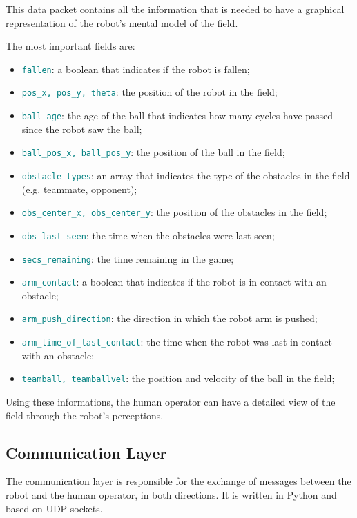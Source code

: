 \documentclass[a4paper, onecolumn, 12pt]{article}
\newcommand\code[1]{\textcolor{teal}{\texttt{#1}}}
\begin{document}
This data packet contains all the information that is needed to have a graphical
representation of the robot's mental model of the field.

The most important fields are:
\begin{itemize}
    \item \code{fallen}: a boolean that indicates if the robot is fallen;
    \item \code{pos\_x, pos\_y, theta}: the position of the robot in the field;
    \item \code{ball\_age}: the age of the ball that indicates how many cycles have passed since the robot saw the ball;
    \item \code{ball\_pos\_x, ball\_pos\_y}: the position of the ball in the field;
    \item \code{obstacle\_types}: an array that indicates the type of the obstacles in the field (e.g. teammate, opponent);
    \item \code{obs\_center\_x, obs\_center\_y}: the position of the obstacles in the field;
    \item \code{obs\_last\_seen}: the time when the obstacles were last seen;
    \item \code{secs\_remaining}: the time remaining in the game;
    \item \code{arm\_contact}: a boolean that indicates if the robot is in contact with an obstacle;
    \item \code{arm\_push\_direction}: the direction in which the robot arm is pushed;
    \item \code{arm\_time\_of\_last\_contact}: the time when the robot was last in contact with an obstacle;
    \item \code{teamball, teamballvel}: the position and velocity of the ball in the field;
\end{itemize}
Using these informations, the human operator can have a detailed view of the field through the robot's perceptions.

\subsection{Communication Layer}

The communication layer is responsible for the exchange of messages between the
robot and the human operator, in both directions. 
It is written in Python and based on UDP sockets. 
\end{document}
